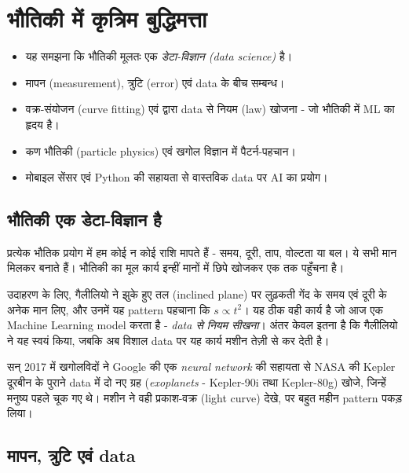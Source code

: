 \chapter{भौतिकी में कृत्रिम बुद्धिमत्ता}
\label{ch:physics}

\lakshyaheading
\begin{itemize}[leftmargin=1.4em]
  \item यह समझना कि भौतिकी मूलतः एक \emph{डेटा-विज्ञान (data science)} है।
  \item मापन (measurement), त्रुटि (error) एवं data के बीच सम्बन्ध।
  \item वक्र-संयोजन (curve fitting) एवं  द्वारा data से
        नियम (law) खोजना - जो भौतिकी में ML का हृदय है।
  \item कण भौतिकी (particle physics) एवं खगोल विज्ञान में पैटर्न-पहचान।
  \item मोबाइल सेंसर एवं Python की सहायता से वास्तविक data पर AI का प्रयोग।
\end{itemize}

\section{भौतिकी एक डेटा-विज्ञान है}

प्रत्येक भौतिक प्रयोग में हम कोई न कोई राशि मापते हैं - समय, दूरी, ताप, वोल्टता या
बल। ये सभी मान मिलकर  बनाते हैं। भौतिकी का मूल कार्य इन्हीं मानों में
छिपे  खोजकर एक  तक पहुँचना है।

उदाहरण के लिए, गैलीलियो ने झुके हुए तल (inclined plane) पर लुढ़कती गेंद के समय एवं
दूरी के अनेक मान लिए, और उनमें यह pattern पहचाना कि $s \propto t^2$। यह ठीक वही कार्य है
जो आज एक Machine Learning model करता है - \emph{data से नियम सीखना}। अंतर केवल इतना है कि
गैलीलियो ने यह स्वयं किया, जबकि अब विशाल data पर यह कार्य मशीन तेज़ी से कर देती है।

\begin{jante}
सन् 2017 में खगोलविदों ने Google की एक \emph{neural network} की सहायता से NASA की
Kepler दूरबीन के पुराने data में दो नए ग्रह (\emph{exoplanets} - Kepler-90i तथा
Kepler-80g) खोजे, जिन्हें मनुष्य पहले चूक गए थे। मशीन ने वही प्रकाश-वक्र (light curve)
देखे, पर बहुत महीन pattern पकड़ लिया।
\end{jante}

\section{मापन, त्रुटि एवं data}

